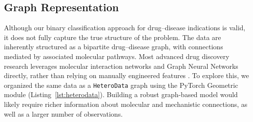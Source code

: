 \subsection{Graph Representation}


Although our binary classification approach for drug--disease indications is valid, 
it does not fully capture the true structure of the problem. The data are inherently structured as a 
bipartite drug--disease graph, with connections mediated by associated molecular pathways. Most advanced
 drug discovery research leverages molecular interaction networks and Graph Neural Networks directly, rather than relying 
 on manually engineered features \cite{keramida2025ai}. To explore this, we organized the same data as 
 a \verb|HeteroData| graph using the PyTorch Geometric module (Listing~\ref{lst:heterodata}). 
 Building a robust graph-based model would likely require richer information about molecular and mechanistic connections, 
 as well as a larger number of observations.


